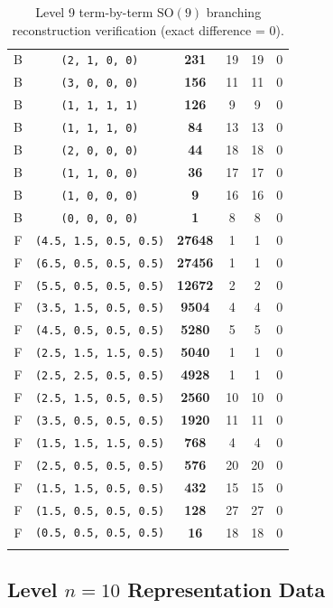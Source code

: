 \documentclass[11pt,a4paper]{article}
\begin{document}
\begin{longtable}{@{}cccccc@{}}
B & \texttt{(2, 1, 0, 0)} & \textbf{231} & 19 & 19 & 0 \\
B & \texttt{(3, 0, 0, 0)} & \textbf{156} & 11 & 11 & 0 \\
B & \texttt{(1, 1, 1, 1)} & \textbf{126} & 9 & 9 & 0 \\
B & \texttt{(1, 1, 1, 0)} & \textbf{84} & 13 & 13 & 0 \\
B & \texttt{(2, 0, 0, 0)} & \textbf{44} & 18 & 18 & 0 \\
B & \texttt{(1, 1, 0, 0)} & \textbf{36} & 17 & 17 & 0 \\
B & \texttt{(1, 0, 0, 0)} & \textbf{9} & 16 & 16 & 0 \\
B & \texttt{(0, 0, 0, 0)} & \textbf{1} & 8 & 8 & 0 \\
F & \texttt{(4.5, 1.5, 0.5, 0.5)} & \textbf{27648} & 1 & 1 & 0 \\
F & \texttt{(6.5, 0.5, 0.5, 0.5)} & \textbf{27456} & 1 & 1 & 0 \\
F & \texttt{(5.5, 0.5, 0.5, 0.5)} & \textbf{12672} & 2 & 2 & 0 \\
F & \texttt{(3.5, 1.5, 0.5, 0.5)} & \textbf{9504} & 4 & 4 & 0 \\
F & \texttt{(4.5, 0.5, 0.5, 0.5)} & \textbf{5280} & 5 & 5 & 0 \\
F & \texttt{(2.5, 1.5, 1.5, 0.5)} & \textbf{5040} & 1 & 1 & 0 \\
F & \texttt{(2.5, 2.5, 0.5, 0.5)} & \textbf{4928} & 1 & 1 & 0 \\
F & \texttt{(2.5, 1.5, 0.5, 0.5)} & \textbf{2560} & 10 & 10 & 0 \\
F & \texttt{(3.5, 0.5, 0.5, 0.5)} & \textbf{1920} & 11 & 11 & 0 \\
F & \texttt{(1.5, 1.5, 1.5, 0.5)} & \textbf{768} & 4 & 4 & 0 \\
F & \texttt{(2.5, 0.5, 0.5, 0.5)} & \textbf{576} & 20 & 20 & 0 \\
F & \texttt{(1.5, 1.5, 0.5, 0.5)} & \textbf{432} & 15 & 15 & 0 \\
F & \texttt{(1.5, 0.5, 0.5, 0.5)} & \textbf{128} & 27 & 27 & 0 \\
F & \texttt{(0.5, 0.5, 0.5, 0.5)} & \textbf{16} & 18 & 18 & 0 \\
\bottomrule
\caption{Level 9 term-by-term $\mathrm{SO}(9)$ branching reconstruction verification (exact difference = 0).}
\end{longtable}

\subsection{Level $n = 10$ Representation Data}
\end{document}
